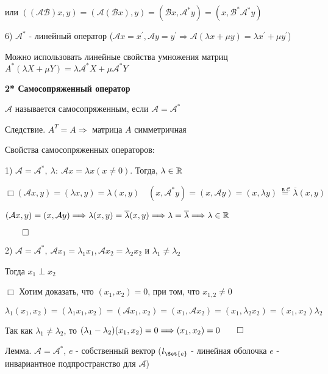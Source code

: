\documentclass[12pt]{article}
\begin{document}
    или $((\mathcal{AB})x, y) = (\mathcal{A}(\mathcal{B}x), y) = (\mathcal{B}x, \mathcal{A}^* y) = (x, \mathcal{B}^* \mathcal{A}^* y)$

    6) $\mathcal{A}^*$ - линейный оператор ($\mathcal{A}x = x^\prime, \mathcal{A}y = y^\prime \Longrightarrow \mathcal{A}(\lambda x + \mu y) = \lambda x^\prime + \mu y^\prime$)

    Можно использовать линейные свойства умножения матриц $A^* (\lambda X + \mu Y) = \lambda \mathcal{A}^* X + \mu \mathcal{A}^* Y$

    \hypertarget{selfconjugateoperator}{}

    \textbf{2* Самосопряженный оператор}

    \Def $\mathcal{A}$ называется самосопряженным, если $\mathcal{A} = \mathcal{A}^*$

    Следствие. $A^T = A \Longrightarrow$ матрица $A$ симметричная

    \hypertarget{selfconjugateoperatorproperties}{}

    Свойства самосопряженных операторов:

    1) $\mathcal{A} = \mathcal{A}^*, \ \lambda : \ \mathcal{A}x = \lambda x (x \neq 0)$. Тогда, $\lambda \in \mathbb{R}$

    $\Box (\mathcal{A}x, y) = (\lambda x, y) = \lambda (x, y) \quad (x, \mathcal{A}^* y) = (x, \mathcal{A}y) = (x, \lambda y) \stackrel{\text{ в } \mathcal{C}}{=} \overline{\lambda} (x, y)$

    $(\mathcal{A}x, y) = (x, \mathcal{A}y) \Longrightarrow \lambda (x, y) = \overline{\lambda} (x, y) \Longrightarrow \lambda = \overline{\lambda} \Longrightarrow \lambda \in \mathbb{R}$

    $\qed$

    2) $\mathcal{A} = \mathcal{A}^*, \ \mathcal{A}x_1 = \lambda_1 x_1, \mathcal{A}x_2 = \lambda_2 x_2$ и $\lambda_1 \neq \lambda_2$

    Тогда $x_1 \perp x_2$

    $\Box$ Хотим доказать, что $(x_1, x_2) = 0$, при том, что $x_{1,2} \neq 0$

    $\lambda_1 (x_1, x_2) = (\lambda_1 x_1, x_2) = (\mathcal{A} x_1, x_2) = (x_1, \mathcal{A} x_2) = (x_1, \lambda_2 x_2) = (x_1, x_2) \lambda_2$

    Так как $\lambda_1 \neq \lambda_2$, то $(\lambda_1 - \lambda_2) (x_1, x_2) = 0 \Longrightarrow (x_1, x_2) = 0 \qed$

    \hypertarget{lemmaabouteigenvectors}{}

    \Th Лемма. $\mathcal{A} = \mathcal{A}^*$, $e$ - собственный вектор ($l_{\Set{e}}$ - линейная оболочка $e$ - инвариантное подпространство для $\mathcal{A}$)
\end{document}
